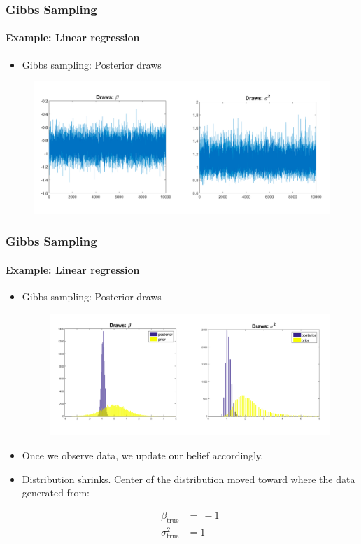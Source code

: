 \documentclass[
  shownotes,
  xcolor={svgnames},
  hyperref={colorlinks,citecolor=DarkBlue,linkcolor=DarkRed,urlcolor=DarkBlue}
  , aspectratio=169]{beamer}
\begin{document}
\begin{frame}[fragile,t]
\frametitle{Gibbs Sampling} 
\framesubtitle{Example: Linear regression}

\begin{itemize}
\item Gibbs sampling: Posterior draws
\end{itemize}
  

\begin{figure}[H] \centering
  \centering
  \includegraphics[scale=0.45]{figures/fig1_gibbs}
  \\
  \tiny 
\end{figure}
   \end{frame}
\begin{frame}[fragile]
\frametitle{Gibbs Sampling} 
\framesubtitle{Example: Linear regression}

\begin{itemize}
\item Gibbs sampling: Posterior draws



  
\begin{figure}[H] \centering
  \centering
  \includegraphics[scale=0.45]{figures/fig2_gibbs}
  \\
  \tiny 
\end{figure}

\footnotesize
\item Once we observe data, we update our belief accordingly.

\item Distribution shrinks. Center of the distribution moved toward where the data generated from:

\begin{align}
\beta_{\text{true}} &= \  - 1 \\
\sigma_{\text{true}}^{2} &= 1
\end{align}

\end{itemize}
 \end{frame}
\end{document}
